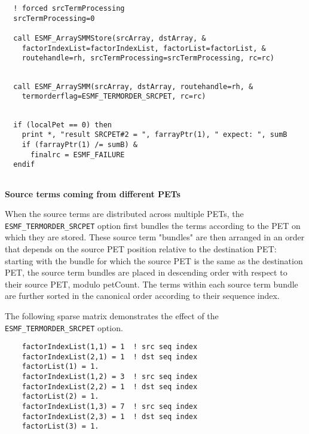  \begin{verbatim}
  ! forced srcTermProcessing
  srcTermProcessing=0
  
  call ESMF_ArraySMMStore(srcArray, dstArray, &
    factorIndexList=factorIndexList, factorList=factorList, &
    routehandle=rh, srcTermProcessing=srcTermProcessing, rc=rc)
 
\end{verbatim}
 

 \begin{verbatim}
  call ESMF_ArraySMM(srcArray, dstArray, routehandle=rh, &
    termorderflag=ESMF_TERMORDER_SRCPET, rc=rc)
 
\end{verbatim}
 

 \begin{verbatim}
  if (localPet == 0) then
    print *, "result SRCPET#2 = ", farrayPtr(1), " expect: ", sumB
    if (farrayPtr(1) /= sumB) &
      finalrc = ESMF_FAILURE
  endif
 
\end{verbatim}
 

   {\bf Source terms coming from different PETs}
  
   When the source terms are distributed across multiple PETs, the 
   {\tt ESMF\_TERMORDER\_SRCPET} option first bundles the terms according to
   the PET on which they are stored. These source term "bundles" are then 
   arranged in an order that depends on the source PET position relative to the
   destination PET: starting with the bundle for which the source PET is the
   same as the destination PET, the source term bundles are placed in descending
   order with respect to their source PET, modulo petCount. The terms within
   each source term bundle are further sorted in the canonical order according
   to their sequence index.
  
   The following sparse matrix demonstrates the effect of the
   {\tt ESMF\_TERMORDER\_SRCPET} option. 

 \begin{verbatim}
    factorIndexList(1,1) = 1  ! src seq index
    factorIndexList(2,1) = 1  ! dst seq index
    factorList(1) = 1.
    factorIndexList(1,2) = 3  ! src seq index
    factorIndexList(2,2) = 1  ! dst seq index
    factorList(2) = 1.
    factorIndexList(1,3) = 7  ! src seq index
    factorIndexList(2,3) = 1  ! dst seq index
    factorList(3) = 1.
 
\end{verbatim}
 
